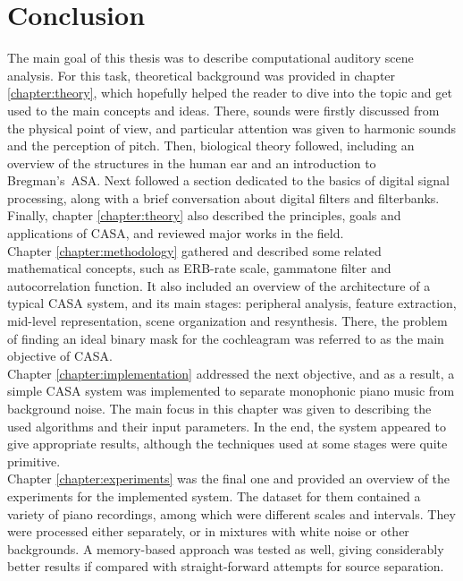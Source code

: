 \chapter{Conclusion}

The main goal of this thesis was to describe computational auditory scene analysis. For this task, theoretical background was provided in chapter \ref{chapter:theory}, which hopefully helped the reader to dive into the topic and get used to the main concepts and ideas. There, sounds were firstly discussed from the physical point of view, and particular attention was given to harmonic sounds and the perception of pitch. Then, biological theory followed, including an overview of the structures in the human ear and an introduction to Bregman's~ASA. Next followed a section dedicated to the basics of digital signal processing, along with a brief conversation about digital filters and filterbanks. Finally, chapter \ref{chapter:theory} also described the principles, goals and applications of CASA, and reviewed major works in the field.\\

Chapter \ref{chapter:methodology} gathered and described some related mathematical concepts, such as ERB-rate scale, gammatone filter and autocorrelation function. It also included an overview of the architecture of a typical CASA system, and its main stages: peripheral analysis, feature extraction, mid-level representation, scene organization and resynthesis. There, the problem of finding an ideal binary mask for the cochleagram was referred to as the main objective of CASA.\\

Chapter \ref{chapter:implementation} addressed the next objective, and as a result, a simple CASA system was implemented to separate monophonic piano music from background noise. The main focus in this chapter was given to describing the used algorithms and their input parameters. In the end, the system appeared to give appropriate results, although the techniques used at some stages were quite primitive.\\

Chapter \ref{chapter:experiments} was the final one and provided an overview of the experiments for the implemented system. The dataset for them contained a variety of piano recordings, among which were diffe\-rent scales and intervals. They were processed either separately, or in mixtures with white noise or other backgrounds. A memory-based approach was tested as well, giving considerably better results if compared with straight-forward attempts for source separation.\\

